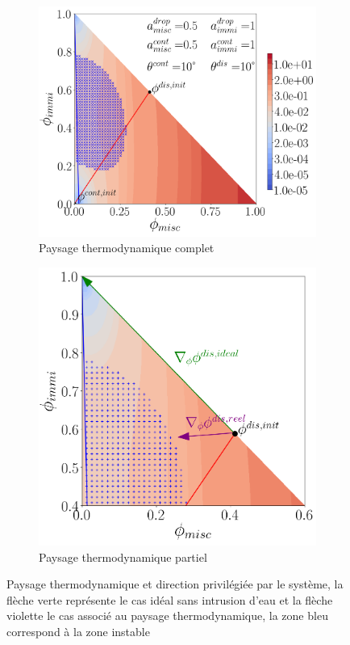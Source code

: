  \begin{figure}[H]
 	\centering
 	\begin{subfigure}[H]{0.45\textwidth}
 		\centering
 		\includegraphics[width=1.2\textwidth]{figure/paysage_neqlocal}
 		\caption{Paysage thermodynamique complet}
 		\label{fig:paysage_thermo_grad}
 	\end{subfigure}
 	\hfill
 	\begin{subfigure}[H]{0.45\textwidth}
 		\centering
 		\includegraphics[width=\textwidth]{figure/direction_gradient}
 		\caption{Paysage thermodynamique partiel}
 		\label{fig:gradpasbon}
 	\end{subfigure}
 	\caption{Paysage thermodynamique et direction privilégiée par le système, la flèche verte représente le cas idéal sans intrusion d'eau et la flèche violette le cas associé au paysage thermodynamique, la zone bleu correspond à la zone instable}
 	\label{fig:paysage_thermo_gradglob}
 \end{figure}\vspace{-0.7cm}
